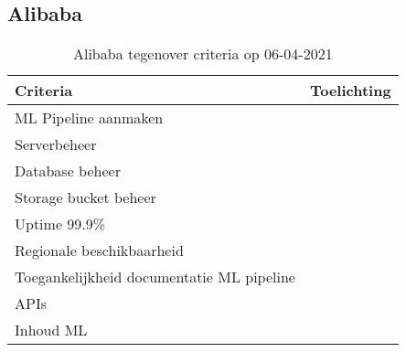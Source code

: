 \subsection*{Alibaba}\label{appendix:detailed-overview-of-cloud-computing-platforms:alibaba}
\begin{table}[hbt!]
  \centering
  \begin{tabular}{|p{.2\linewidth}|p{.74\linewidth}|}
  \hline
  \textbf{Criteria} & \textbf{Toelichting} \\ \hline
    ML Pipeline \newline aanmaken
    &

    \\ \hline

    Serverbeheer
    &

    \\ \hline

    Database beheer
    &

    \\ \hline

    Storage \newline bucket beheer
    &

    \\ \hline

    Uptime 99.9\%
    &

    \\ \hline

    Regionale \newline beschikbaarheid
    &

    \\ \hline

    Toegankelijkheid documentatie ML pipeline
    &

    \\ \hline

    APIs
    &

    \\ \hline

    Inhoud ML
    &

    \\ \hline
  \end{tabular}
  \caption{Alibaba tegenover criteria op 06-04-2021}
  \label{table:alibaba-against-criteria}
\end{table}

\newpage


